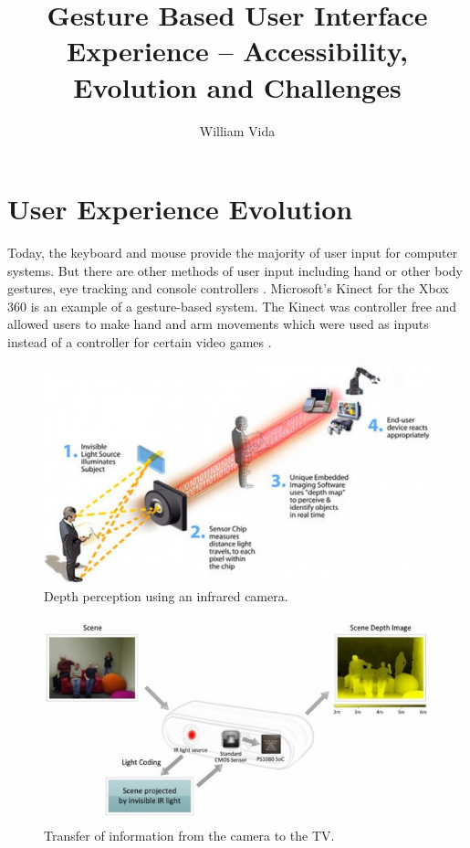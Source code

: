 \documentclass{article}
\title{Gesture Based User Interface Experience – Accessibility, Evolution and Challenges}
\author{William Vida}
\date{}
\begin{document}
\maketitle

\section*{User Experience Evolution}
Today, the keyboard and mouse provide the majority of user input for computer systems. But there are other methods of user input including hand or other body gestures, eye tracking and console controllers \cite{bhuiyan2009gesture}. Microsoft's Kinect for the Xbox 360 is an example of a gesture-based system. The Kinect was controller free and allowed users to make hand and arm movements which were used as inputs instead of a controller for certain video games \cite{10.1007/978-3-642-34182-3_4}.

\begin{figure}[h!]
	\centering
	\includegraphics[width=1.0\linewidth]{images/depth-perception-using-the-infrared-camera.jpg}
	\caption{Depth perception using an infrared camera.}
	\label{fig:Depth perception using an infrared camera.}
\end{figure}

\begin{figure}[H]
	\centering
	\includegraphics[width=1.0\linewidth]{images/transfer-of-information-from-the-camera-to-the-TV.png}
	\caption{Transfer of information from the camera to the TV.}
	\label{fig:Transfer of information from the camera to the TV.}
\end{figure}
\end{document}

